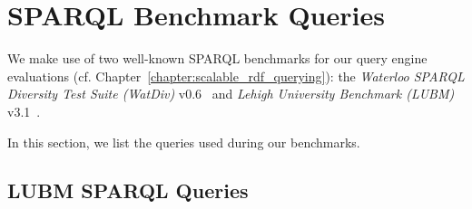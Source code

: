 \chapter{SPARQL Benchmark Queries}
\label{sec:appendix-sparql-benchmark-queries}
We make use of two well-known SPARQL benchmarks for our query engine evaluations (cf. Chapter~\ref{chapter:scalable_rdf_querying}): 
the \textit{Waterloo SPARQL Diversity Test Suite (WatDiv)} v0.6~\cite{Alu2014DiversifiedST} and \textit{Lehigh University Benchmark (LUBM)} v3.1~\cite{Guo2005LUBMAB}.

In this section, we list the queries used during our benchmarks.

\section{LUBM SPARQL Queries}


